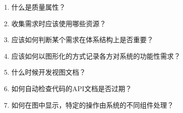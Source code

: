 \begin{enumerate}
\item
什么是质量属性？

\item
收集需求时应该使用哪些资源？

\item
应该如何判断某个需求在体系结构上是否重要？

\item
应该如何以图形化的方式记录各方对系统的功能性需求？

\item
什么时候开发视图文档？

\item
如何自动检查代码的API文档是否过期？

\item
如何在图中显示，特定的操作由系统的不同组件处理？

\end{enumerate}